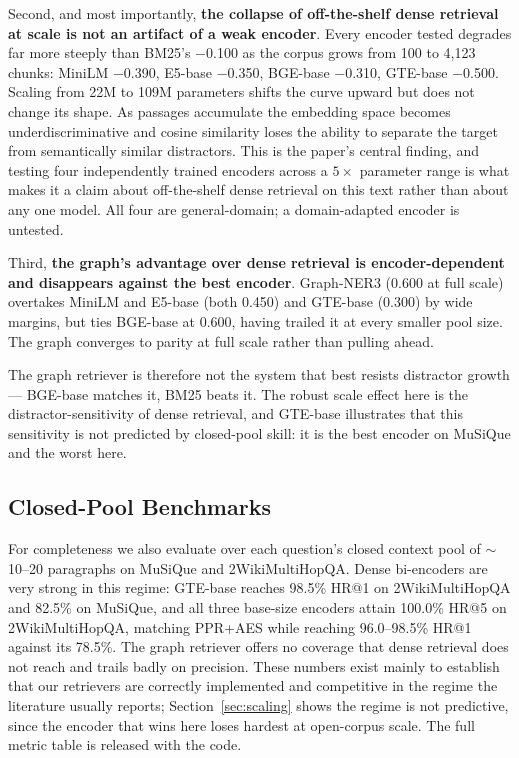 \documentclass[runningheads]{llncs}
\begin{document}
Second, and most importantly, \textbf{the collapse of off-the-shelf dense retrieval at scale is not an artifact of a weak encoder}. Every encoder tested degrades far more steeply than BM25's $-$0.100 as the corpus grows from 100 to 4{,}123 chunks: MiniLM $-$0.390, E5-base $-$0.350, BGE-base $-$0.310, GTE-base $-$0.500. Scaling from 22M to 109M parameters shifts the curve upward but does not change its shape. As passages accumulate the embedding space becomes underdiscriminative and cosine similarity loses the ability to separate the target from semantically similar distractors. This is the paper's central finding, and testing four independently trained encoders across a $5\times$ parameter range is what makes it a claim about off-the-shelf dense retrieval on this text rather than about any one model. All four are general-domain; a domain-adapted encoder is untested.

Third, \textbf{the graph's advantage over dense retrieval is encoder-dependent and disappears against the best encoder}. Graph-NER3 (0.600 at full scale) overtakes MiniLM and E5-base (both 0.450) and GTE-base (0.300) by wide margins, but ties BGE-base at 0.600, having trailed it at every smaller pool size. The graph converges to parity at full scale rather than pulling ahead.

The graph retriever is therefore not the system that best resists distractor growth --- BGE-base matches it, BM25 beats it. The robust scale effect here is the distractor-sensitivity of dense retrieval, and GTE-base illustrates that this sensitivity is not predicted by closed-pool skill: it is the best encoder on MuSiQue and the worst here.

\subsection{Closed-Pool Benchmarks}
\label{sec:musique_2wiki}

For completeness we also evaluate over each question's closed context pool of $\sim$10--20 paragraphs on MuSiQue and 2WikiMultiHopQA. Dense bi-encoders are very strong in this regime: GTE-base reaches 98.5\% HR@1 on 2WikiMultiHopQA and 82.5\% on MuSiQue, and all three base-size encoders attain 100.0\% HR@5 on 2WikiMultiHopQA, matching PPR+AES while reaching 96.0--98.5\% HR@1 against its 78.5\%. The graph retriever offers no coverage that dense retrieval does not reach and trails badly on precision. These numbers exist mainly to establish that our retrievers are correctly implemented and competitive in the regime the literature usually reports; Section~\ref{sec:scaling} shows the regime is not predictive, since the encoder that wins here loses hardest at open-corpus scale. The full metric table is released with the code.
\end{document}

